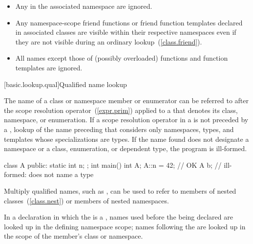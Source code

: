 \begin{itemize}
\item Any  in the associated namespace are
ignored.

\item Any namespace-scope friend functions or friend function templates
declared in associated classes are visible within their respective
namespaces even if they are not visible during an ordinary
lookup~(\ref{class.friend}).

\item All names except those of (possibly overloaded) functions and
function templates are ignored.

\end{itemize}

[basic.lookup.qual]{Qualified name lookup}

\pnum
{}%
%
%
The name of a class or namespace member
or enumerator can be referred to after the
\tcode{::} scope resolution operator~(\ref{expr.prim}) applied to a
 that denotes its class,
namespace, or enumeration.
If a
\tcode{::} scope resolution
operator
in a  is not preceded by a ,
lookup of the name preceding that \tcode{::} considers only namespaces, types, and
templates whose specializations are types. If the
name found does not designate a namespace or a class, enumeration, or dependent type,
the program is ill-formed.\enterexample

\begin{codeblock}
class A {
public:
  static int n;
};
int main() {
  int A;
  A::n = 42;        // OK
  A b;              // ill-formed:  does not name a type
}
\end{codeblock}
\exitexample 

\pnum
\enternote Multiply qualified names, such as , can
be used to refer to members of nested classes~(\ref{class.nest}) or
members of nested namespaces. \exitnote

\pnum
In a declaration in which the  is a
, names used before the 
being declared are looked up in the defining namespace scope; names
following the  are looked up in the scope of the
member's class or namespace. \enterexample

